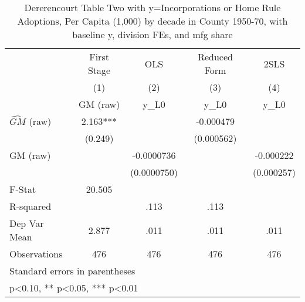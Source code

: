 \begin{table}[htbp]\centering
\def\sym#1{\ifmmode^{#1}\else\(^{#1}\)\fi}
\caption{Dererencourt Table Two with y=Incorporations or Home Rule Adoptions, Per Capita (1,000) by decade in County 1950-70, with baseline y, division FEs, and mfg share}
\begin{tabular}{l*{4}{c}}
\toprule
                    & First Stage   &         OLS   &Reduced Form   &        2SLS   \\
                    &\multicolumn{1}{c}{(1)}&\multicolumn{1}{c}{(2)}&\multicolumn{1}{c}{(3)}&\multicolumn{1}{c}{(4)}\\
                    &\multicolumn{1}{c}{GM  (raw)}&\multicolumn{1}{c}{y\_L0}&\multicolumn{1}{c}{y\_L0}&\multicolumn{1}{c}{y\_L0}\\
\midrule
$\hat{GM}$ (raw)    &       2.163***&               &   -0.000479   &               \\
                    &     (0.249)   &               &  (0.000562)   &               \\
\addlinespace
GM  (raw)           &               &  -0.0000736   &               &   -0.000222   \\
                    &               & (0.0000750)   &               &  (0.000257)   \\
\midrule
F-Stat              &      20.505   &               &               &               \\
R-squared           &               &        .113   &        .113   &               \\
Dep Var Mean        &       2.877   &        .011   &        .011   &        .011   \\
Observations        &         476   &         476   &         476   &         476   \\
\bottomrule
\multicolumn{5}{l}{\footnotesize Standard errors in parentheses}\\
\multicolumn{5}{l}{\footnotesize * p<0.10, ** p<0.05, *** p<0.01}\\
\end{tabular}
\end{table}

